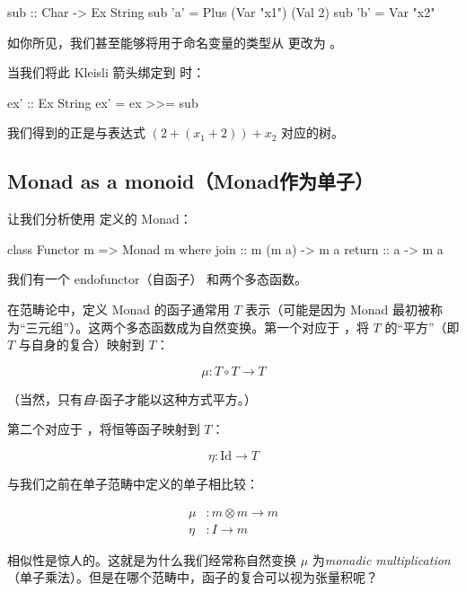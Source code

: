 \documentclass[DaoFP]{subfiles}
\begin{document}
    \begin{haskell}
        sub :: Char -> Ex String
        sub 'a' = Plus (Var "x1") (Val 2)
        sub 'b' = Var "x2"
    \end{haskell}

    如你所见，我们甚至能够将用于命名变量的类型从  更改为 。

    当我们将此 Kleisli 箭头绑定到  时：

    \begin{haskell}
        ex' :: Ex String
        ex' = ex >>= sub
    \end{haskell}

    我们得到的正是与表达式 $(2 + (x_1 + 2)) + x_2$ 对应的树。

    \subsection{Monad as a monoid（Monad作为单子）}

    让我们分析使用  定义的 Monad：

    \begin{haskell}
        class Functor m => Monad m where
        join :: m (m a) -> m a
        return :: a -> m a
    \end{haskell}

    我们有一个 endofunctor（自函子）  和两个多态函数。

    在范畴论中，定义 Monad 的函子通常用 $T$ 表示（可能是因为 Monad 最初被称为“三元组”）。这两个多态函数成为自然变换。第一个对应于 ，将 $T$ 的“平方”（即 $T$ 与自身的复合）映射到 $T$：

    \[ \mu \colon T \circ T \to T \]

    （当然，只有\emph{自}-函子才能以这种方式平方。）

    第二个对应于 ，将恒等函子映射到 $T$：

    \[ \eta \colon \text{Id} \to T \]

    与我们之前在单子范畴中定义的单子相比较：

    \begin{align*}
        \mu &\colon m \otimes m \to m \\
        \eta &\colon I \to m
    \end{align*}

    相似性是惊人的。这就是为什么我们经常称自然变换 $\mu$ 为\emph{monadic multiplication}（单子乘法）。但是在哪个范畴中，函子的复合可以视为张量积呢？
\end{document}
